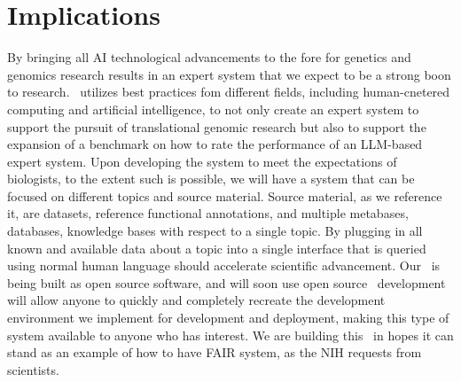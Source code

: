 \section{Implications}
By bringing all AI technological advancements to the fore for genetics and genomics research results in an expert system that we expect to be a strong boon to research.
\project\ utilizes best practices fom different fields, including human-cnetered computing and artificial intelligence, to not only create an expert system to support the pursuit of translational genomic research but also to support the expansion of a benchmark on how to rate the performance of an LLM-based expert system.
Upon developing the system to meet the expectations of biologists, to the extent such is possible, we will have a system that can be focused on different topics and source material.
Source material, as we reference it, are datasets, reference functional annotations, and multiple metabases, databases, knowledge bases with respect to a single topic.
By plugging in all known and available data about a topic into a single interface that is queried using normal human language should accelerate scientific advancement.
Our \project\ is being built as open source software, and will soon use open source \llms
\guix\ development will allow anyone to quickly and completely recreate the development environment we implement for development and deployment, making this type of system available to anyone who has interest.
We are building this \project\ in hopes it can stand as an example of how to have FAIR system, as the NIH requests from scientists.